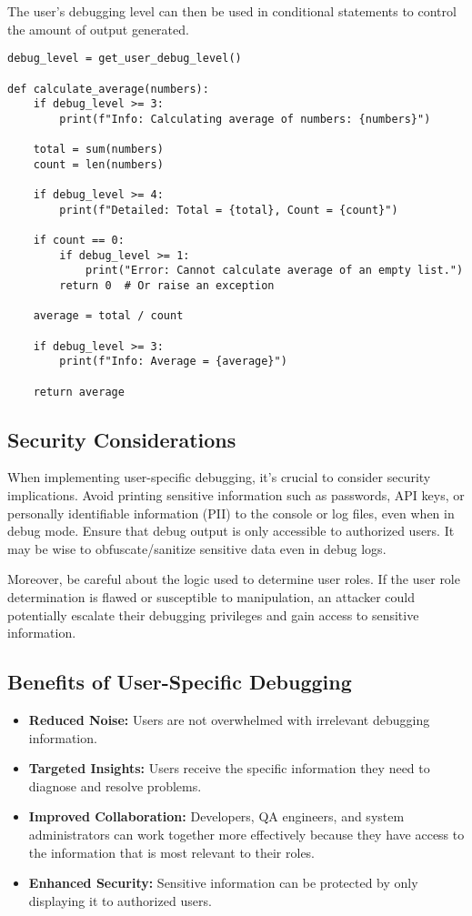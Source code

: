 \documentclass{article}
\begin{document}
{{{The user's debugging level can then be used in conditional statements to control the amount of output generated.

\begin{verbatim}
debug_level = get_user_debug_level()

def calculate_average(numbers):
    if debug_level >= 3:
        print(f"Info: Calculating average of numbers: {numbers}")

    total = sum(numbers)
    count = len(numbers)

    if debug_level >= 4:
        print(f"Detailed: Total = {total}, Count = {count}")

    if count == 0:
        if debug_level >= 1:
            print("Error: Cannot calculate average of an empty list.")
        return 0  # Or raise an exception

    average = total / count

    if debug_level >= 3:
        print(f"Info: Average = {average}")

    return average
\end{verbatim}

\subsection*{Security Considerations}

When implementing user-specific debugging, it's crucial to consider security implications.  Avoid printing sensitive information such as passwords, API keys, or personally identifiable information (PII) to the console or log files, even when in debug mode. Ensure that debug output is only accessible to authorized users.  It may be wise to obfuscate/sanitize sensitive data even in debug logs.

Moreover, be careful about the logic used to determine user roles. If the user role determination is flawed or susceptible to manipulation, an attacker could potentially escalate their debugging privileges and gain access to sensitive information.

\subsection*{Benefits of User-Specific Debugging}

\begin{itemize}
    \item \textbf{Reduced Noise:}  Users are not overwhelmed with irrelevant debugging information.
    \item \textbf{Targeted Insights:}  Users receive the specific information they need to diagnose and resolve problems.
    \item \textbf{Improved Collaboration:}  Developers, QA engineers, and system administrators can work together more effectively because they have access to the information that is most relevant to their roles.
    \item \textbf{Enhanced Security:}  Sensitive information can be protected by only displaying it to authorized users.
\end{itemize}

}}}
\end{document}
